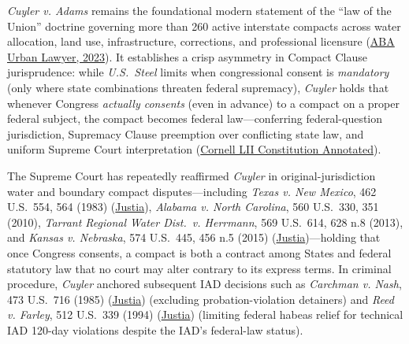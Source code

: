 \documentclass[12pt]{article}
\begin{document}
\textit{Cuyler v. Adams} remains the foundational modern statement of the ``law of the Union'' doctrine governing more than 260 active interstate compacts across water allocation, land use, infrastructure, corrections, and professional licensure (\href{https://www.americanbar.org/groups/state_local_government/resources/urban-lawyer/52-3/developments-interstate-compact-law-practice-2023/}{ABA Urban Lawyer, 2023}). It establishes a crisp asymmetry in Compact Clause jurisprudence: while \textit{U.S.\ Steel} limits when congressional consent is \textit{mandatory} (only where state combinations threaten federal supremacy), \textit{Cuyler} holds that whenever Congress \textit{actually consents} (even in advance) to a compact on a proper federal subject, the compact becomes federal law---conferring federal-question jurisdiction, Supremacy Clause preemption over conflicting state law, and uniform Supreme Court interpretation (\href{https://www.law.cornell.edu/constitution-conan/article-1/section-1/clause-3/legal-effect-and-interpretation-of-compacts}{Cornell LII Constitution Annotated}).

The Supreme Court has repeatedly reaffirmed \textit{Cuyler} in original-jurisdiction water and boundary compact disputes---including \textit{Texas v. New Mexico}, 462 U.S.\ 554, 564 (1983) (\href{https://supreme.justia.com/cases/federal/us/462/554/}{Justia}), \textit{Alabama v. North Carolina}, 560 U.S.\ 330, 351 (2010), \textit{Tarrant Regional Water Dist.\ v. Herrmann}, 569 U.S.\ 614, 628 n.8 (2013), and \textit{Kansas v. Nebraska}, 574 U.S.\ 445, 456 n.5 (2015) (\href{https://supreme.justia.com/cases/federal/us/574/445/}{Justia})---holding that once Congress consents, a compact is both a contract among States and federal statutory law that no court may alter contrary to its express terms. In criminal procedure, \textit{Cuyler} anchored subsequent IAD decisions such as \textit{Carchman v. Nash}, 473 U.S.\ 716 (1985) (\href{https://supreme.justia.com/cases/federal/us/473/716/}{Justia}) (excluding probation-violation detainers) and \textit{Reed v. Farley}, 512 U.S.\ 339 (1994) (\href{https://supreme.justia.com/cases/federal/us/512/339/}{Justia}) (limiting federal habeas relief for technical IAD 120-day violations despite the IAD's federal-law status).
\end{document}
